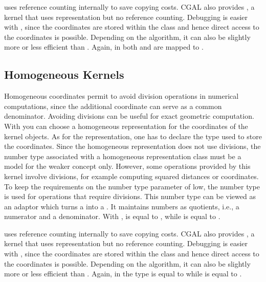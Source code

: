  uses reference counting internally to
save copying costs. CGAL also provides
, a kernel that uses
 representation but no reference
counting.  Debugging is easier with
, since the coordinates are
stored within the class and hence direct access to the coordinates is
possible.  Depending on the algorithm, it can also be slightly more or
less efficient than . Again, in
 both
 and
 are mapped to
.

\subsection{Homogeneous Kernels}
Homogeneous coordinates permit to avoid division operations in
numerical computations, since the additional coordinate can serve as a
common denominator.  Avoiding divisions can be useful for exact
geometric computation.  With  you can
choose a homogeneous representation for the coordinates of the kernel
objects. As for the  representation, one
has to declare the type used to store the coordinates. Since the
homogeneous representation does not use divisions, the number type
associated with a homogeneous representation class must be a model for
the weaker concept  only. However, some operations
provided by this kernel involve divisions, for example computing
squared distances or  coordinates. To
keep the requirements on the number type parameter of
 low, the number type
 is used for operations that require
divisions. This number type can be viewed as an adaptor which turns a
 into a . It maintains numbers as
quotients, i.e., a numerator and a denominator. With
,
 is equal to
, while
 is equal to
.

 uses reference counting internally
to save copying costs. CGAL also provides
, a kernel that uses
 representation but no reference
counting. Debugging is easier with
, since the coordinates are
stored within the class and hence direct access to the coordinates is
possible. Depending on the algorithm, it can also be slightly more or
less efficient than . Again, in
 the type
 is equal to
 while
 is equal to
.

